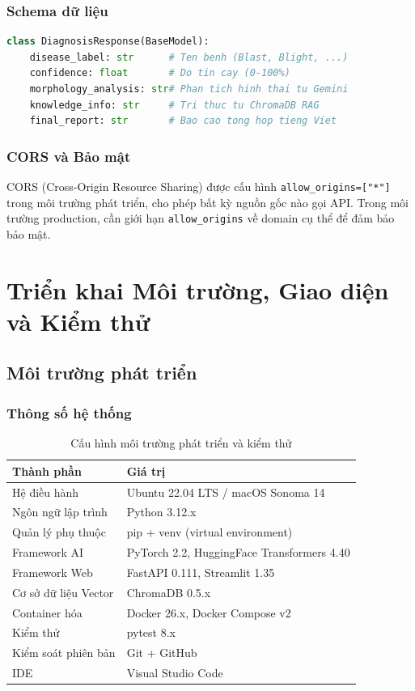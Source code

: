 \documentclass[13pt,a4paper]{extreport}
\begin{document}
\subsection{Schema dữ liệu}
\begin{lstlisting}[language=Python, caption={Pydantic response model cho endpoint /diagnose}, label={lst:pydantic}]
class DiagnosisResponse(BaseModel):
    disease_label: str      # Ten benh (Blast, Blight, ...)
    confidence: float       # Do tin cay (0-100%)
    morphology_analysis: str# Phan tich hinh thai tu Gemini
    knowledge_info: str     # Tri thuc tu ChromaDB RAG
    final_report: str       # Bao cao tong hop tieng Viet
\end{lstlisting}

\subsection{CORS và Bảo mật}
CORS (Cross-Origin Resource Sharing) được cấu hình \texttt{allow\_origins=["*"]} trong môi trường phát triển, cho phép bất kỳ nguồn gốc nào gọi API. Trong môi trường production, cần giới hạn \texttt{allow\_origins} về domain cụ thể để đảm bảo bảo mật.

\chapter{Triển khai Môi trường, Giao diện và Kiểm thử}

\section{Môi trường phát triển}

\subsection{Thông số hệ thống}
\begin{table}[H]
\centering
\caption{Cấu hình môi trường phát triển và kiểm thử}
\label{tab:env_specs}
\begin{tabular}{ll}
\toprule
\textbf{Thành phần} & \textbf{Giá trị} \\
\midrule
Hệ điều hành & Ubuntu 22.04 LTS / macOS Sonoma 14 \\
Ngôn ngữ lập trình & Python 3.12.x \\
Quản lý phụ thuộc & pip + venv (virtual environment) \\
Framework AI & PyTorch 2.2, HuggingFace Transformers 4.40 \\
Framework Web & FastAPI 0.111, Streamlit 1.35 \\
Cơ sở dữ liệu Vector & ChromaDB 0.5.x \\
Container hóa & Docker 26.x, Docker Compose v2 \\
Kiểm thử & pytest 8.x \\
Kiểm soát phiên bản & Git + GitHub \\
IDE & Visual Studio Code \\
\bottomrule
\end{tabular}
\end{table}
\end{document}
